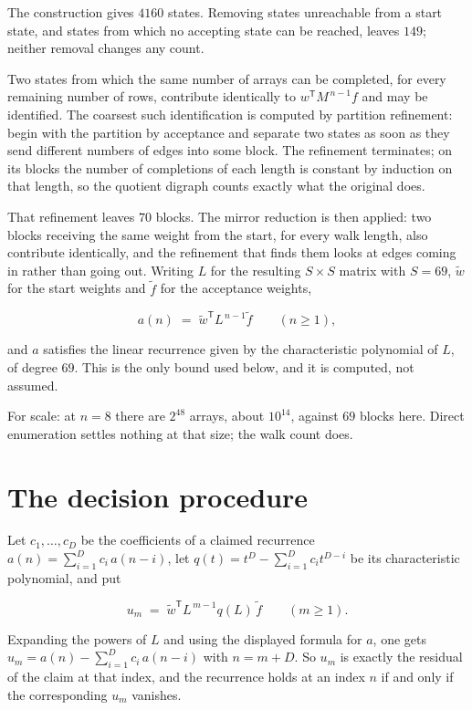 \documentclass[11pt]{article}
\theoremstyle{definition}
\begin{document}
The construction gives $4160$ states. Removing states unreachable from a start state, and states from which no accepting state can be reached, leaves $149$; neither removal changes any count.

Two states from which the same number of arrays can be completed, for every remaining number of rows, contribute identically to $w^{\mathsf T}M^{\,n-1}f$ and may be identified. The coarsest such identification is computed by partition refinement: begin with the partition by acceptance and separate two states as soon as they send different numbers of edges into some block. The refinement terminates; on its blocks the number of completions of each length is constant by induction on that length, so the quotient digraph counts exactly what the original does.

That refinement leaves $70$ blocks. The mirror reduction is then applied: two blocks receiving the same weight from the start, for every walk length, also contribute identically, and the refinement that finds them looks at edges coming in rather than going out. Writing $L$ for the resulting $S \times S$ matrix with $S = 69$, $\tilde w$ for the start weights and $\tilde f$ for the acceptance weights,

\[a(n) \;=\; \tilde w^{\mathsf T} L^{\,n-1} \tilde f \qquad (n \ge 1),\]

and $a$ satisfies the linear recurrence given by the characteristic polynomial of $L$, of degree $69$. This is the only bound used below, and it is computed, not assumed.

For scale: at $n = 8$ there are $2^{48}$ arrays, about $10^{14}$, against $69$ blocks here. Direct enumeration settles nothing at that size; the walk count does.

\section{The decision procedure}

Let $c_1,\dots,c_D$ be the coefficients of a claimed recurrence $a(n) = \sum_{i=1}^{D} c_i\,a(n-i)$, let $q(t) = t^{D} - \sum_{i=1}^{D} c_i t^{D-i}$ be its characteristic polynomial, and put

\[u_m \;=\; \tilde w^{\mathsf T} L^{\,m-1} q(L)\,\tilde f \qquad (m \ge 1).\]

Expanding the powers of $L$ and using the displayed formula for $a$, one gets $u_m = a(n) - \sum_{i=1}^{D} c_i\,a(n-i)$ with $n = m + D$. So $u_m$ is exactly the residual of the claim at that index, and the recurrence holds at an index $n$ if and only if the corresponding $u_m$ vanishes.
\end{document}
